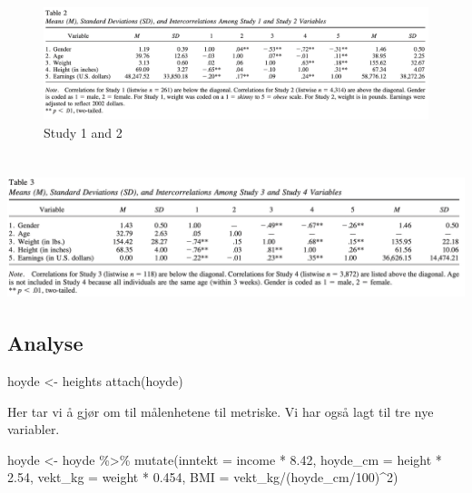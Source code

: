 \documentclass[
  12pt,
  norsk,
]{article}
\newenvironment{Shaded}{\begin{snugshade}}{\end{snugshade}}
\newcommand{\AttributeTok}[1]{\textcolor[rgb]{0.77,0.63,0.00}{#1}}
\newcommand{\DecValTok}[1]{\textcolor[rgb]{0.00,0.00,0.81}{#1}}
\newcommand{\FloatTok}[1]{\textcolor[rgb]{0.00,0.00,0.81}{#1}}
\newcommand{\FunctionTok}[1]{\textcolor[rgb]{0.00,0.00,0.00}{#1}}
\newcommand{\NormalTok}[1]{#1}
\newcommand{\OtherTok}[1]{\textcolor[rgb]{0.56,0.35,0.01}{#1}}
\newcommand{\SpecialCharTok}[1]{\textcolor[rgb]{0.00,0.00,0.00}{#1}}
\begin{document}
\begin{figure}
\centering
\includegraphics{Skjermbilde 2021-10-21 kl. 10.30.39.png}
\caption{Study 1 and 2}
\end{figure}

\hypertarget{study-3-and-4}{%
\section{\texorpdfstring{\protect\includegraphics{Skjermbilde 2021-10-21 kl. 10.29.47.png}}{Study 3 and 4}}\label{study-3-and-4}}

\hypertarget{analyse}{%
\subsection{Analyse}\label{analyse}}

\begin{Shaded}
\begin{Highlighting}[]
\NormalTok{hoyde }\OtherTok{\textless{}{-}}\NormalTok{ heights}
\FunctionTok{attach}\NormalTok{(hoyde)}
\end{Highlighting}
\end{Shaded}

Her tar vi å gjør om til målenhetene til metriske. Vi har også lagt til
tre nye variabler.

\begin{Shaded}
\begin{Highlighting}[]
\NormalTok{hoyde }\OtherTok{\textless{}{-}}\NormalTok{ hoyde }\SpecialCharTok{\%\textgreater{}\%} 
  \FunctionTok{mutate}\NormalTok{(}\AttributeTok{inntekt =}\NormalTok{ income }\SpecialCharTok{*} \FloatTok{8.42}\NormalTok{,}
         \AttributeTok{hoyde\_cm =}\NormalTok{ height }\SpecialCharTok{*} \FloatTok{2.54}\NormalTok{,}
         \AttributeTok{vekt\_kg =}\NormalTok{ weight }\SpecialCharTok{*} \FloatTok{0.454}\NormalTok{,}
         \AttributeTok{BMI =}\NormalTok{ vekt\_kg}\SpecialCharTok{/}\NormalTok{(hoyde\_cm}\SpecialCharTok{/}\DecValTok{100}\NormalTok{)}\SpecialCharTok{\^{}}\DecValTok{2}\NormalTok{)}
\end{Highlighting}
\end{Shaded}
\end{document}

